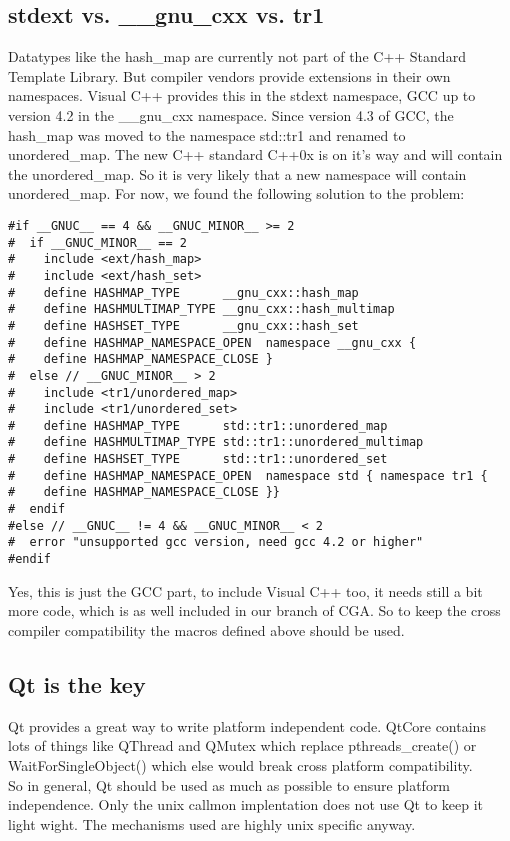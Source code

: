 \subsection{stdext vs. \_\_gnu\_cxx vs. tr1} Datatypes like the hash\_map are currently not part of the C++ Standard Template Library. But compiler vendors provide extensions in their own namespaces. Visual C++ provides this in the stdext namespace, GCC up to version 4.2 in the \_\_gnu\_cxx namespace. Since version 4.3 of GCC, the hash\_map was moved to the namespace std::tr1 and renamed to unordered\_map. The new C++ standard C++0x is on it's way and will contain the unordered\_map. So it is very likely that a new namespace will contain unordered\_map. For now, we found the following solution to the problem:
\begin{verbatim}
#if __GNUC__ == 4 && __GNUC_MINOR__ >= 2
#  if __GNUC_MINOR__ == 2
#    include <ext/hash_map>
#    include <ext/hash_set>
#    define HASHMAP_TYPE      __gnu_cxx::hash_map
#    define HASHMULTIMAP_TYPE __gnu_cxx::hash_multimap
#    define HASHSET_TYPE      __gnu_cxx::hash_set
#    define HASHMAP_NAMESPACE_OPEN  namespace __gnu_cxx {
#    define HASHMAP_NAMESPACE_CLOSE }
#  else // __GNUC_MINOR__ > 2
#    include <tr1/unordered_map>
#    include <tr1/unordered_set>
#    define HASHMAP_TYPE      std::tr1::unordered_map
#    define HASHMULTIMAP_TYPE std::tr1::unordered_multimap
#    define HASHSET_TYPE      std::tr1::unordered_set
#    define HASHMAP_NAMESPACE_OPEN  namespace std { namespace tr1 {
#    define HASHMAP_NAMESPACE_CLOSE }}
#  endif
#else // __GNUC__ != 4 && __GNUC_MINOR__ < 2
#  error "unsupported gcc version, need gcc 4.2 or higher"
#endif
\end{verbatim}
Yes, this is just the GCC part, to include Visual C++ too, it needs still a bit more code, which is as well included in our branch of CGA. So to keep the cross compiler compatibility the macros defined above should be used. 

\subsection{Qt is the key} Qt provides a great way to write platform independent code. QtCore contains lots of things like QThread and QMutex which replace pthreads\_create() or WaitForSingleObject() which else would break cross platform compatibility.\\

So in general, Qt should be used as much as possible to ensure platform independence. Only the unix callmon implentation does not use Qt to keep it light wight. The mechanisms used are highly unix specific anyway. 

